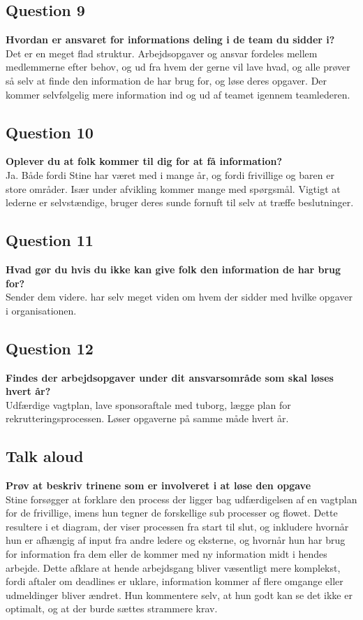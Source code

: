 \subsection{Question 9}
\label{i4q9}
\noindent \textbf{Hvordan er ansvaret for informations deling i de team du sidder i?} \\
Det er en meget flad struktur. Arbejdsopgaver og ansvar fordeles mellem medlemmerne efter behov, og ud fra hvem der gerne vil lave hvad, og alle prøver så selv at finde den information de har brug for, og løse deres opgaver. Der kommer selvfølgelig mere information ind og ud af teamet igennem  teamlederen.

\subsection{Question 10}
\label{i4q10}
\noindent \textbf{Oplever du at folk kommer til dig for at få information?} \\
Ja. Både fordi Stine har været med i mange år, og fordi frivillige og baren er store områder. Især under afvikling kommer mange med spørgsmål. Vigtigt at lederne er selvstændige, bruger deres sunde fornuft til selv at træffe beslutninger. 

\subsection{Question 11}
\label{i4q11}
\noindent \textbf{Hvad gør du hvis du ikke kan give folk den information de har brug for?} \\
Sender dem videre. har selv meget viden om hvem der sidder med hvilke opgaver i organisationen.

\subsection{Question 12}
\label{i4q12}
\noindent \textbf{Findes der arbejdsopgaver under dit ansvarsområde som skal løses hvert år?} \\
Udfærdige vagtplan, lave sponsoraftale med tuborg, lægge plan for rekrutteringsprocessen. Løser opgaverne på samme måde hvert år.

\subsection{Talk aloud}
\label{i4q13}
\noindent \textbf{Prøv at beskriv trinene som er involveret i at løse den opgave} \\
Stine forsøgger at forklare den process der ligger bag udfærdigelsen af en vagtplan for de frivillige, imens hun tegner de forskellige sub processer og flowet. Dette resultere i et diagram, der viser processen fra start til slut, og inkludere hvornår hun er afhængig af input fra andre ledere og eksterne, og hvornår hun har brug for information fra dem eller de kommer med ny information midt i hendes arbejde. Dette afklare at hende arbejdsgang bliver væsentligt mere komplekst, fordi aftaler om deadlines er uklare, information kommer af flere omgange eller udmeldinger bliver ændret. Hun kommentere selv, at hun godt kan se det ikke er optimalt, og at der burde sættes strammere krav.